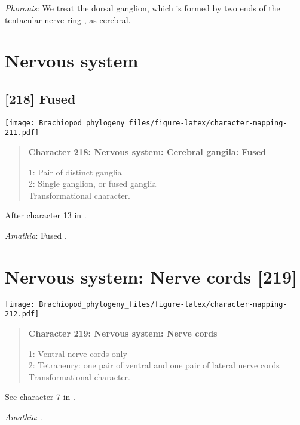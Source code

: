 \documentclass[openany]{book}
\theoremstyle{definition}
\theoremstyle{definition}
\theoremstyle{definition}
\theoremstyle{remark}
\begin{document}
\hypertarget{Phoronis-coding-217}{}
\emph{Phoronis}: We treat the dorsal ganglion, which is formed by two
ends of the tentacular nerve ring \citep{Temereva2016Phoronida}, as
cerebral.

\section{Nervous system}\label{nervous-system-1}

\subsection*{{[}218{]} Fused}\label{fused}

\texttt{[image: Brachiopod\_phylogeny\_files/figure-latex/character-mapping-211.pdf]}

\begin{quote}
\textbf{Character 218: Nervous system: Cerebral gangila: Fused}

1: Pair of distinct ganglia\\
2: Single ganglion, or fused ganglia\\
Transformational character.
\end{quote}

After character 13 in \citet{Haszprunar1996}.

\hypertarget{Amathia-coding-218}{}
\emph{Amathia}: Fused \citep{Temereva2016Thenervous}.

\section{Nervous system: Nerve cords
{[}219{]}}\label{nervous-system-nerve-cords-219}

\texttt{[image: Brachiopod\_phylogeny\_files/figure-latex/character-mapping-212.pdf]}

\begin{quote}
\textbf{Character 219: Nervous system: Nerve cords}

1: Ventral nerve cords only\\
2: Tetraneury: one pair of ventral and one pair of lateral nerve cords\\
Transformational character.
\end{quote}

See character 7 in \citet{Haszprunar2008}.

\hypertarget{Amathia-coding-219}{}
\emph{Amathia}: \citet{Temereva2016Thenervous}.
\end{document}
